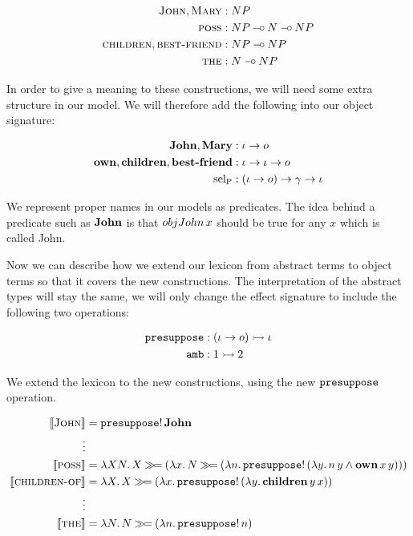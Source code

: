 \begin{align*}
  \textsc{John}, \textsc{Mary} &: NP \\
  \textsc{poss} &: NP \mathbin{{-}\mkern-3.5mu{\circ}} N \mathbin{{-}\mkern-3.5mu{\circ}} NP \\
  \textsc{children}, \textsc{best-friend} &: NP \mathbin{{-}\mkern-3.5mu{\circ}} NP \\
  \textsc{the} &: N \mathbin{{-}\mkern-3.5mu{\circ}} NP
\end{align*}

In order to give a meaning to these constructions, we will need some extra
structure in our model. We will therefore add the following into our
object signature:

\begin{align*}
  \textbf{John}, \textbf{Mary} &: \iota \to o \\
  \textbf{own}, \textbf{children}, \textbf{best-friend} &: \iota \to \iota \to o \\
  \operatorname{sel_P} &: (\iota \to o) \to \gamma \to \iota
\end{align*}

We represent proper names in our models as predicates. The idea behind a
predicate such as $\textbf{John}$ is that $obj{John}\,x$ should be true
for any $x$ which is called John.

Now we can describe how we extend our lexicon from abstract terms to object
terms so that it covers the new constructions. The interpretation of the
abstract types will stay the same, we will only change the effect signature
to include the following two operations:

\begin{align*}
\mathtt{presuppose} &: (\iota \to o) \rightarrowtail \iota \\
\mathtt{amb} &: 1 \rightarrowtail 2
\end{align*}

We extend the lexicon to the new constructions, using the new
$\mathtt{presuppose}$ operation.

\begin{align*}
  \llbracket \textsc{John} \rrbracket &= \mathtt{presuppose}!\,\textbf{John} \\
  \vdots \\
  \llbracket \textsc{poss} \rrbracket &= \lambda X N.\, X \mathbin{\gg\!=} (\lambda x.\, N \mathbin{\gg\!=} (\lambda n.\, \mathtt{presuppose}!\,(\lambda y.\, n\,y \land \textbf{own}\,x\,y))) \\
  \llbracket \textsc{children-of} \rrbracket &= \lambda X.\, X \mathbin{\gg\!=} (\lambda x.\, \mathtt{presuppose}!\,(\lambda y.\, \textbf{children}\,y\,x)) \\
  \vdots \\
  \llbracket \textsc{the} \rrbracket &= \lambda N.\, N \mathbin{\gg\!=} (\lambda n.\, \mathtt{presuppose}!\,n)
\end{align*}

